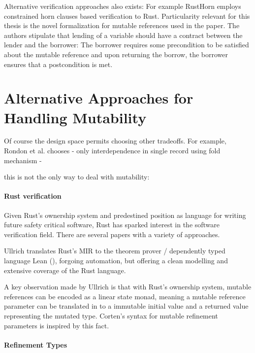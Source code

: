 \documentclass[twoside, english]{sdqthesis}
\theoremstyle{definition}
\begin{document}
Alternative verification approaches also exists: For example RustHorn\cite{matsushita_rusthorn_2020} employs constrained horn clauses based verification to Rust. Particularity relevant for this thesis is the novel formalization for mutable references used in the paper. 
The authors stipulate that lending of a variable should have a contract between the lender and the borrower: The borrower requires some precondition to be satisfied about the mutable reference and upon returning the borrow, the borrower ensures that a postcondition is met. 


\section{Alternative Approaches for Handling Mutability} \label{subsec:related-work-mutability} 

Of course the design space permits choosing other tradeoffs. For example, Rondon et al. \cite{rondon_low-level_2010} chooses 
  - only interdependence in single record using fold mechanism
  - 

this is not the only way to deal with mutability: 

\paragraph*{Rust verification}

Given Rust's ownership system and predestined position as language for writing future safety critical software, Rust has sparked interest in the software verification field. There are several papers with a variety of approaches.


Ullrich \cite{ullrich_simple_nodate} translates Rust's MIR to the theorem prover / dependently typed language Lean (\cite{de_moura_lean_2015}), forgoing automation, but offering a clean modelling and extensive coverage of the Rust language.

A key observation made by Ullrich is that with Rust's ownership system, mutable references can be encoded as a linear state monad, meaning a mutable reference parameter can be translated in to a immutable initial value and a returned value representing the mutated type. Corten's syntax for mutable refinement parameters is inspired by this fact.

\paragraph*{Refinement Types}
\end{document}
